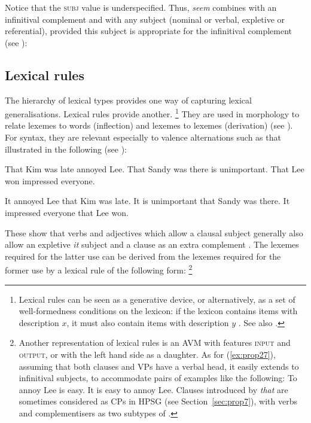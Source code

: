 \documentclass[output=paper
	        ,collection
	        ,collectionchapter
 	        ,biblatex
                ,babelshorthands
                ,newtxmath
                ,draftmode
                ,colorlinks, citecolor=brown
]{langscibook}
\begin{document}
\noindent
Notice that the \textsc{subj} value is underspecified. Thus, \emph{seem} combines with an
infinitival complement and with any subject (nominal or verbal, expletive or referential), provided
this subject is appropriate for the infinitival complement (see
): 

\eal\label{ex:prop25}
\zl


\subsection{Lexical rules}\label{sec:prop4.2}
\label{prop:sec-lex-rules}

The hierarchy of lexical types provides one way of capturing lexical generalisations. Lexical rules provide another.%
%
\footnote{Lexical rules can be seen as a generative device, or alternatively, as a set of
  well-formedness conditions on the lexicon: if the lexicon contains items with description $x$, it
  must also contain items with description $y$ \citep{Meurers2001a}. See also .}
%
They are used in morphology to relate lexemes to words (inflection) and lexemes to lexemes
(derivation) (see ). For syntax, they are relevant especially to valence alternations such as that illustrated in the following (see ):

\eal\label{ex:prop26}
\ex That Kim was late annoyed Lee.
\ex That Sandy was there is unimportant. 
\ex That Lee won impressed everyone.
\zl
	
\eal\label{ex:prop27}
\ex It annoyed Lee that Kim was late.
\ex It is unimportant that Sandy was there. 
\ex It impressed everyone that Lee won.
\zl

\noindent
These show that verbs and adjectives which allow a clausal subject generally also allow an expletive \emph{it} subject and a clause as an extra complement \citep[150]{ps2}. The lexemes required for the latter use can be derived from the lexemes required for the former use by a lexical rule of the following form:%
%
\footnote{Another representation of lexical rules is an AVM with features \textsc{input} and \textsc{output}, or with the left hand side as a daughter. As for (\ref{ex:prop27}), assuming that both clauses and VPs have a verbal head, it easily extends to infinitival subjects, to accommodate pairs of examples like the following:
	\eal
        \ex To annoy Lee is easy.
	\ex It is easy to annoy Lee.
	\zl
Clauses introduced by \emph{that} are sometimes considered as CPs in HPSG (see Section~\ref{sec:prop7}), with verbs and complementisers as two subtypes of .
}
%
\end{document}
